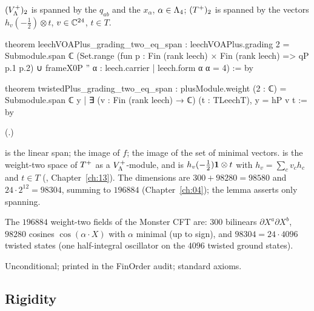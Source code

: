 \begin{lemma}\label{ch20:lem:span}
$(V_{\Lambda}^{+})_2$ is spanned by the $q_{ab}$ and the $x_\alpha$, $\alpha\in{\Lambda}_4$; $(T^{+})_2$ is spanned by the vectors
$h_v(-\tfrac12)\otimes t$, $v\in{\mathbb{C}}^{24}$, $t\in T$.
\end{lemma}
\begin{leancode}
theorem leechVOAPlus_grading_two_eq_span :
    leechVOAPlus.grading 2 = Submodule.span ℂ
      (Set.range (fun p : Fin (rank leech) × Fin (rank leech) => qP p.1 p.2) ∪
        frameX0P '' {α : leech.carrier | leech.form α α = 4}) := by

theorem twistedPlus_grading_two_eq_span :
    plusModule.weight (2 : ℂ) = Submodule.span ℂ
      {y | ∃ (v : Fin (rank leech) → ℂ) (t : TLeechT), y = hP v t} := by
\end{leancode}
(.)
\begin{dictionary}
 is the linear span;  the image of $f$;  the image of
the set of minimal vectors.   is the weight-two space of $T^{+}$ as a
$V_{\Lambda}^{+}$-module, and  is $h_v(-\tfrac12)\mathbf 1\otimes t$ with $h_v=\sum_cv_ch_c$ and $t\in T$
(, Chapter~\ref{ch:13}).  The dimensions are $300+98280=98580$ and $24\cdot2^{12}=98304$, summing to $196884$
(Chapter~\ref{ch:04}); the lemma asserts only spanning.
\end{dictionary}
\begin{physics}
The $196884$ weight-two fields of the Monster CFT are: $300$ bilinears $\partial X^a\partial X^b$, $98280$ cosines
$\cos(\alpha\cdot X)$ with $\alpha$ minimal (up to sign), and $98304=24\cdot4096$ twisted states (one half-integral oscillator on
the $4096$ twisted ground states).
\end{physics}
\begin{status}
Unconditional; printed in the FinOrder audit; standard axioms.
\end{status}

\subsection{Rigidity}\label{ch20:sec:rigid}

